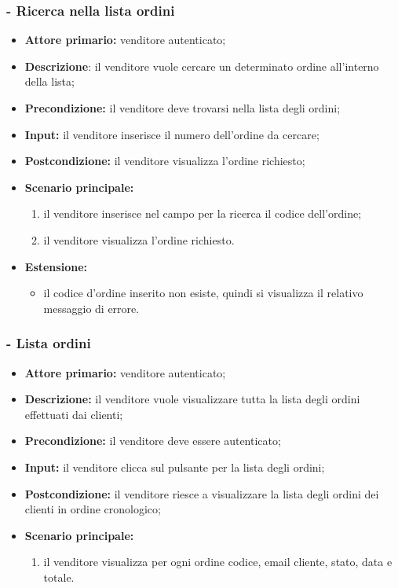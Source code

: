 \subsubsection{- Ricerca nella lista ordini}
\begin{itemize}
    \item \textbf{Attore primario:} venditore autenticato;
    \item \textbf{Descrizione}: il venditore vuole cercare un determinato ordine all'interno della lista;
    \item \textbf{Precondizione:} il venditore deve trovarsi nella lista degli ordini;
    \item \textbf{Input:} il venditore inserisce il numero dell'ordine da cercare;
    \item \textbf{Postcondizione:} il venditore visualizza l'ordine richiesto;
    \item \textbf{Scenario principale:}
        \begin{enumerate}
            \item il venditore inserisce nel campo per la ricerca il codice dell'ordine;
            \item il venditore visualizza l'ordine richiesto.
        \end{enumerate}
    \item \textbf{Estensione:}
    \begin{itemize}
        \item il codice d'ordine inserito non esiste, quindi si visualizza il relativo messaggio di errore.
    \end{itemize}
\end{itemize}

\stepsubUserCase
\subsubsection{ - Lista ordini}
\begin{itemize}
    \item \textbf{Attore primario:} venditore autenticato;
    \item \textbf{Descrizione:} il venditore vuole visualizzare tutta la lista degli ordini effettuati dai clienti;
    \item \textbf{Precondizione:} il venditore deve essere autenticato;
    \item \textbf{Input:} il venditore clicca sul pulsante per la lista degli ordini;
    \item \textbf{Postcondizione:} il venditore riesce a visualizzare la lista degli ordini dei clienti in ordine cronologico;
    \item \textbf{Scenario principale:}
        \begin{enumerate}
            \item il venditore visualizza per ogni ordine codice, email cliente, stato, data e totale.
        \end{enumerate}
\end{itemize}

